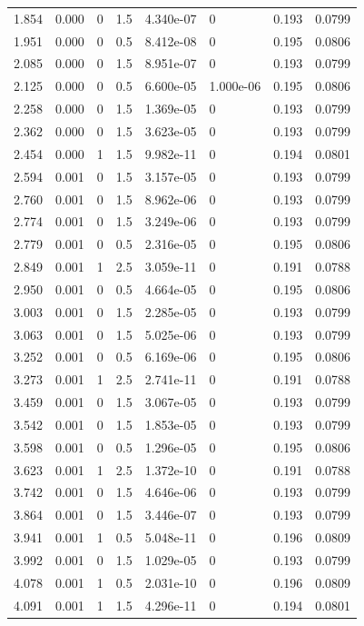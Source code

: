 \documentclass[preview]{standalone}
\begin{document}
{{\begin{tabular}{L{1.2cm}C{1.2cm} C{0.3cm}C{0.5cm} C{1.4cm}C{1.4cm} C{1.4cm}C{1.4cm}}
  1.854  &  0.000  & 0     & 1.5 &  4.340e-07  & 0  & 0.193 &  0.0799   \\ 
  1.951  &  0.000  & 0     & 0.5 &  8.412e-08  & 0  & 0.195 &  0.0806   \\ 
  2.085  &  0.000  & 0     & 1.5 &  8.951e-07  & 0  & 0.193 &  0.0799   \\ 
  2.125  &  0.000  & 0     & 0.5 &  6.600e-05  & 1.000e-06  & 0.195 &  0.0806   \\ 
  2.258  &  0.000  & 0     & 1.5 &  1.369e-05  & 0  & 0.193 &  0.0799   \\ 
  2.362  &  0.000  & 0     & 1.5 &  3.623e-05  & 0  & 0.193 &  0.0799   \\ 
  2.454  &  0.000  & 1     & 1.5 &  9.982e-11  & 0  & 0.194 &  0.0801   \\ 
  2.594  &  0.001  & 0     & 1.5 &  3.157e-05  & 0  & 0.193 &  0.0799   \\ 
  2.760  &  0.001  & 0     & 1.5 &  8.962e-06  & 0  & 0.193 &  0.0799   \\ 
  2.774  &  0.001  & 0     & 1.5 &  3.249e-06  & 0  & 0.193 &  0.0799   \\ 
  2.779  &  0.001  & 0     & 0.5 &  2.316e-05  & 0  & 0.195 &  0.0806   \\ 
  2.849  &  0.001  & 1     & 2.5 &  3.059e-11  & 0  & 0.191 &  0.0788   \\ 
  2.950  &  0.001  & 0     & 0.5 &  4.664e-05  & 0  & 0.195 &  0.0806   \\ 
  3.003  &  0.001  & 0     & 1.5 &  2.285e-05  & 0  & 0.193 &  0.0799   \\ 
  3.063  &  0.001  & 0     & 1.5 &  5.025e-06  & 0  & 0.193 &  0.0799   \\ 
  3.252  &  0.001  & 0     & 0.5 &  6.169e-06  & 0  & 0.195 &  0.0806   \\ 
  3.273  &  0.001  & 1     & 2.5 &  2.741e-11  & 0  & 0.191 &  0.0788   \\ 
  3.459  &  0.001  & 0     & 1.5 &  3.067e-05  & 0  & 0.193 &  0.0799   \\ 
  3.542  &  0.001  & 0     & 1.5 &  1.853e-05  & 0  & 0.193 &  0.0799   \\ 
  3.598  &  0.001  & 0     & 0.5 &  1.296e-05  & 0  & 0.195 &  0.0806   \\ 
  3.623  &  0.001  & 1     & 2.5 &  1.372e-10  & 0  & 0.191 &  0.0788   \\ 
  3.742  &  0.001  & 0     & 1.5 &  4.646e-06  & 0  & 0.193 &  0.0799   \\ 
  3.864  &  0.001  & 0     & 1.5 &  3.446e-07  & 0  & 0.193 &  0.0799   \\ 
  3.941  &  0.001  & 1     & 0.5 &  5.048e-11  & 0  & 0.196 &  0.0809   \\ 
  3.992  &  0.001  & 0     & 1.5 &  1.029e-05  & 0  & 0.193 &  0.0799   \\ 
  4.078  &  0.001  & 1     & 0.5 &  2.031e-10  & 0  & 0.196 &  0.0809   \\ 
  4.091  &  0.001  & 1     & 1.5 &  4.296e-11  & 0  & 0.194 &  0.0801   \\ 
\hline 
\end{tabular} 

}}
\end{document}
